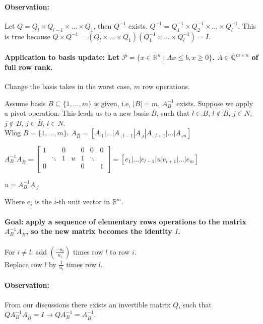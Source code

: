 \documentclass[main]{subfiles}
\begin{document}
\paragraph{Observation:}
Let $Q = Q_l \times Q_{l-1} \times \dots \times Q_1$, then $Q^{-1}$ exists.
$Q^{-1} = Q^{-1}_1 \times Q^{-1}_2 \times \dots \times Q^{-1}_l$. This is true
because $Q \times Q^{-1} = (Q_l \times \dots \times Q_1)(Q^{-1}_1 \times \dots
\times Q^{-1}_l) = I$.

\paragraph{Application to basis update: Let $\mathcal{P} = \{x \in
\mathbb{R}^n \mid Ax \leq b, x \geq 0\}$. $A \in \mathbb{Q}^{m \times n}$ of
full row rank.}
Change the basis takes in the worst case, $m$ row operations.


Assume basis $B \subseteq \{1, \dots, m\}$ is given, i.e, $|B| = m$, $A^{-1}_B$
exists. Suppose we apply a pivot operation. This leads us to a new basis
$\bar{B}$, such that $l \in B$, $l \notin \bar{B}$, $j \in N$, $j \notin B$,
$j \in \bar{B}$, $l \in N$.\\
Wlog $B = \{1, \dots, m\}$. $A_{\bar{B}} = [A_{\cdot 1} | \dots |
A_{\cdot, l-1} | A_{\cdot j} | A_{\cdot ,l+1} |\dots |A_{\cdot m}]$

$A^{-1}_B A_{\bar{B}} =
\left[
\begin{array}{ccc|c|ccc}
1 &  & 0 & & 0 & 0 & 0 \\
 & \ddots & 1 & u & 1 & \ddots & \\
0 & &  &  & 0 & & 1\\
\end{array}
\right]
=
[e_1 | \dots | e_{l-1} | u |e_{l+1} | \dots | e_m ]$

$u = A^{-1}_B A_{\cdot j }$

Where $e_i$ is the $i$-th unit vector in $\mathbb{R}^m$.

\paragraph{Goal: apply a sequence of elementary rows operations to the matrix
$A^{-1}_B A_{\bar{B}}$, so the new matrix becomes the identity $I$.}

For $i \neq l$: add $(\frac{-u_i}{u_l})$ times row $l$ to row $i$.\\
Replace row $l$ by $\frac{1}{u_l}$ times row $l$.

\paragraph{Observation:} From our discussions there exists an invertible matrix
$Q$, such that $Q A^{-1}_B A_{\bar{B}} = I \rightarrow Q A^{-1}_B =
A^{-1}_{\bar{B}}$.
\end{document}
